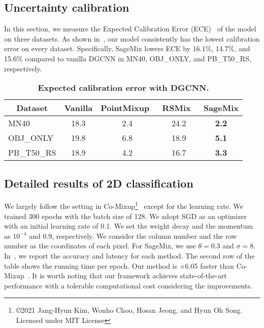 \documentclass{article}
\begin{document}
\subsection{Uncertainty calibration}
\label{sec:calibration}
In this section, we measure the Expected Calibration Error (ECE)~\cite{guo2017calibration} of the model on three datasets.
As shown in~, our model consistently has the lowest calibration error on every dataset. Specifically, SageMix lowers ECE by 16.1\%, 14.7\%, and 15.6\% compared to vanilla DGCNN in MN40, OBJ\_ONLY, and PB\_T50\_RS, respectively.  

\begin{table}[h!]
  \centering 
  \setlength{\tabcolsep}{5pt}
  \caption{\textbf{Expected calibration error with DGCNN.}}
  \label{table:calibration} 
  \begin{tabular}{l|ccc|c}
  \toprule
  \multicolumn{1}{c|}{\textbf{Dataset}} & Vanilla& PointMixup~\cite{chen2020pointmixup} & RSMix~\cite{lee2021regularization} & \textbf{SageMix}\\

  \midrule
  \midrule
  MN40& 18.3&2.4&24.2&\textbf{2.2}\\
  OBJ\_ONLY & 19.8 & 6.8 & 18.9 & \textbf{5.1}\\
  PB\_T50\_RS& 18.9 &4.2&16.7&\textbf{3.3} \\
  \bottomrule
  \end{tabular}
  
  
\end{table}  
\subsection{Detailed results of 2D classification}
\label{sec:detailed2D}
We largely follow the setting in Co-Mixup\footnote{\copyright 2021 Jang-Hyun Kim, Wonho Choo, Hosan Jeong, and Hyun Oh Song. Licensed under MIT License}~\cite{DBLP:conf/iclr/KimCJS21} except for the learning rate. We trained 300 epochs with the batch size of 128. We adopt SGD as an optimizer with an initial learning rate of 0.1. We set the weight decay and the momentum as $10^{-4}$ and 0.9, respectively. We consider the column number and the row number as the coordinates of each pixel.
For SageMix, we use $\theta=0.3$ and  $\sigma=8$.
In~, we report the accuracy and latency for each method. The second row of the table shows the running time per epoch. Our method is $\times$6.05 faster than Co-Mixup~\cite{DBLP:conf/iclr/KimCJS21}. 
It is worth noting that our framework achieves state-of-the-art performance with a tolerable computational cost considering the improvements.
\end{document}
